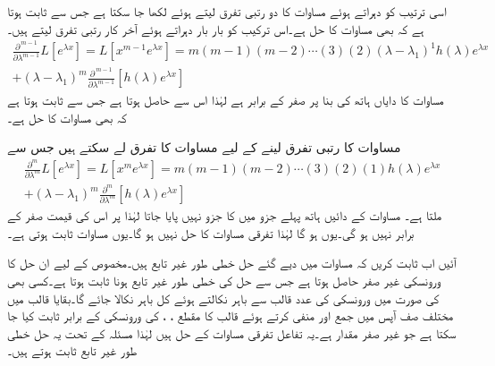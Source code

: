 اسی ترتیب کو دہراتے ہوئے مساوات  کا دو رتبی تفرق لیتے ہوئے  لکھا جا سکتا ہے جس سے ثابت ہوتا ہے کہ  بھی مساوات  کا حل ہے۔اس ترکیب کو بار بار دہراتے ہوئے آخر کار  رتبی تفرق لیتے ہیں۔
\begin{multline}\label{مساوات_سادہ_بلند_متعدد_گنا_جذر_ٹ}
\frac{\partial^{\, m-1} }{\partial \lambda^{m-1}} L[e^{\lambda x}]=L[x^{m-1}e^{\lambda x}]=m(m-1)(m-2)\cdots (3)(2)(\lambda-\lambda_1)^{1}h(\lambda)e^{\lambda x}\\
+(\lambda-\lambda_1)^m \frac{\partial^{\, m-1}}{\partial \lambda^{m-1}}[h(\lambda)e^{\lambda x}]
\end{multline}
مساوات کا دایاں ہاتھ  کی بنا  پر صفر کے برابر ہے لہٰذا اس سے  حاصل ہوتا ہے جس سے ثابت ہوتا ہے کہ  بھی مساوات  کا حل ہے۔

مساوات  کا  رتبی تفرق لینے کے لیے مساوات  کا تفرق لے سکتے ہیں جس سے
\begin{multline*}
\frac{\partial^m }{\partial \lambda^m} L[e^{\lambda x}]=L[x^me^{\lambda x}]=m(m-1)(m-2)\cdots (3)(2)(1)h(\lambda)e^{\lambda x}\\
+(\lambda-\lambda_1)^m \frac{\partial^m}{\partial \lambda^m}[h(\lambda)e^{\lambda x}]
\end{multline*}
ملتا ہے۔ مساوات کے دائیں ہاتھ پہلے جزو میں  کا جزو نہیں پایا جاتا لہٰذا  پر اس کی قیمت صفر کے برابر نہیں ہو گی۔یوں  ہو گا لہٰذا  تفرقی مساوات  کا حل نہیں ہو گا۔یوں مساوات  ثابت ہوتی ہے۔

آئیں اب ثابت کریں کہ مساوات  میں دیے گئے حل خطی طور غیر تابع ہیں۔مخصوص  کے لیے ان حل کا ورونسکی غیر صفر حاصل ہوتا ہے جس سے حل کی خطی طور غیر تابع ہونا ثابت ہوتا ہے۔کسی بھی  کی صورت میں ورونسکی کی  عدد  قالب سے  باہر نکالتے ہوئے  کل  باہر نکالا جائے گا۔بقایا قالب میں مختلف صف آپس میں جمع اور منفی کرتے ہوئے قالب کا مقطع  ، ،   کی ورونسکی کے برابر ثابت کیا  جا سکتا ہے جو غیر صفر مقدار ہے۔یہ تفاعل تفرقی مساوات  کے حل ہیں لہٰذا مسئلہ  کے تحت یہ حل خطی طور غیر تابع ثابت ہوتے ہیں۔

